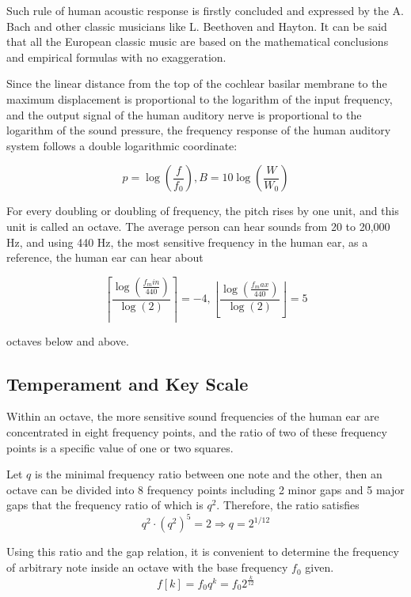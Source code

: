 \documentclass[conference]{IEEEtran}
\begin{document}
Such rule of human acoustic response is firstly concluded and expressed by the A. Bach and other classic musicians like L. Beethoven and Hayton. It can be said that all the European classic music are based on the mathematical conclusions and empirical formulas with no exaggeration.

Since the linear distance from the top of the cochlear basilar membrane to the maximum displacement is proportional to the logarithm of the input frequency, and the output signal of the human auditory nerve is proportional to the logarithm of the sound pressure, the frequency response of the human auditory system follows a double logarithmic coordinate:

\begin{equation}
	p=\log(\frac{f}{f_{0}}),B=10\log(\frac{W}{W_0})
\end{equation}

For every doubling or doubling of frequency, the pitch rises by one unit, and this unit is called an octave. The average person can hear sounds from 20 to 20,000 Hz, and using 440 Hz, the most sensitive frequency in the human ear, as a reference, the human ear can hear about

\begin{equation}
	\left\lceil \frac{\log(\frac{f_min}{440})}{\log(2)} \right\rceil=-4, \left\lfloor \frac{\log(\frac{f_max}{440})}{\log(2)} \right\rfloor=5
\end{equation}

octaves below and above.

\subsection{Temperament and Key Scale}
Within an octave, the more sensitive sound frequencies of the human ear are concentrated in eight frequency points, and the ratio of two of these frequency points is a specific value of one or two squares.

Let \(q\) is the minimal frequency ratio between one note and the other, then an octave can be divided into 8 frequency points including 2 minor gaps and 5 major gaps that the frequency ratio of which is \(q^{2}\). Therefore, the ratio satisfies
\begin{equation}
	q^{2}\cdot (q^ {2})^ {5}=2\Rightarrow q=2^{1/12}
\end{equation}

Using this ratio and the gap relation, it is convenient to determine the frequency of arbitrary note inside an octave with the base frequency \(f_{0}\) given.
\begin{equation}
	f[k]=f_{0}q^{k}=f_{0}2^{\frac{k}{12}}
\end{equation}
\end{document}
